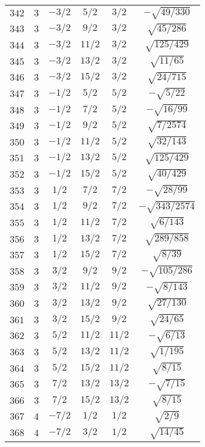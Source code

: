 \begin{table}
\begin{center}
\begin{tabular}{|c|c|c|c|c|c|}
$342$ & $3$ & $-3/2$ & $5/2$ & $3/2$ & $-\sqrt{49/330}$ \\ 
$343$ & $3$ & $-3/2$ & $9/2$ & $3/2$ & $\sqrt{45/286}$ \\ 
$344$ & $3$ & $-3/2$ & $11/2$ & $3/2$ & $\sqrt{125/429}$ \\ 
$345$ & $3$ & $-3/2$ & $13/2$ & $3/2$ & $\sqrt{11/65}$ \\ 
$346$ & $3$ & $-3/2$ & $15/2$ & $3/2$ & $\sqrt{24/715}$ \\ 
$347$ & $3$ & $-1/2$ & $5/2$ & $5/2$ & $-\sqrt{5/22}$ \\ 
$348$ & $3$ & $-1/2$ & $7/2$ & $5/2$ & $-\sqrt{16/99}$ \\ 
$349$ & $3$ & $-1/2$ & $9/2$ & $5/2$ & $\sqrt{7/2574}$ \\ 
$350$ & $3$ & $-1/2$ & $11/2$ & $5/2$ & $\sqrt{32/143}$ \\ 
$351$ & $3$ & $-1/2$ & $13/2$ & $5/2$ & $\sqrt{125/429}$ \\ 
$352$ & $3$ & $-1/2$ & $15/2$ & $5/2$ & $\sqrt{40/429}$ \\ 
$353$ & $3$ & $1/2$ & $7/2$ & $7/2$ & $-\sqrt{28/99}$ \\ 
$354$ & $3$ & $1/2$ & $9/2$ & $7/2$ & $-\sqrt{343/2574}$ \\ 
$355$ & $3$ & $1/2$ & $11/2$ & $7/2$ & $\sqrt{6/143}$ \\ 
$356$ & $3$ & $1/2$ & $13/2$ & $7/2$ & $\sqrt{289/858}$ \\ 
$357$ & $3$ & $1/2$ & $15/2$ & $7/2$ & $\sqrt{8/39}$ \\ 
$358$ & $3$ & $3/2$ & $9/2$ & $9/2$ & $-\sqrt{105/286}$ \\ 
$359$ & $3$ & $3/2$ & $11/2$ & $9/2$ & $-\sqrt{8/143}$ \\ 
$360$ & $3$ & $3/2$ & $13/2$ & $9/2$ & $\sqrt{27/130}$ \\ 
$361$ & $3$ & $3/2$ & $15/2$ & $9/2$ & $\sqrt{24/65}$ \\ 
$362$ & $3$ & $5/2$ & $11/2$ & $11/2$ & $-\sqrt{6/13}$ \\ 
$363$ & $3$ & $5/2$ & $13/2$ & $11/2$ & $\sqrt{1/195}$ \\ 
$364$ & $3$ & $5/2$ & $15/2$ & $11/2$ & $\sqrt{8/15}$ \\ 
$365$ & $3$ & $7/2$ & $13/2$ & $13/2$ & $-\sqrt{7/15}$ \\ 
$366$ & $3$ & $7/2$ & $15/2$ & $13/2$ & $\sqrt{8/15}$ \\ 
$367$ & $4$ & $-7/2$ & $1/2$ & $1/2$ & $\sqrt{2/9}$ \\ 
$368$ & $4$ & $-7/2$ & $3/2$ & $1/2$ & $\sqrt{14/45}$ \\ 

\end{tabular}
\end{center}
\end{table}
